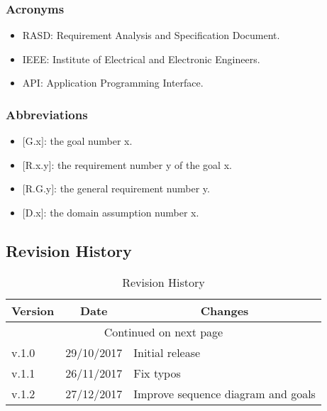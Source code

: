 \subsubsection{Acronyms}
\begin{itemize}
\renewcommand{\labelitemi}{$-$}
\item
RASD: Requirement Analysis and Specification Document.
\item
IEEE: Institute of Electrical and Electronic Engineers.
\item
API: Application Programming Interface.
\end{itemize}

\subsubsection{Abbreviations}
\begin{itemize}
\renewcommand{\labelitemi}{$-$}
\item
$[$G.x$]$: the goal number x.
\item
$[$R.x.y$]$: the requirement number y of the goal x.
\item
$[$R.G.y$]$: the general requirement number y.
\item
$[$D.x$]$: the domain assumption number x.
\end{itemize}

\subsection{Revision History}
\begin{center}
\begin{longtable}{|p{2cm} | p{3cm}| p{8cm}|}
\hline \multicolumn{1}{|c|}{\textbf{Version}} & \multicolumn{1}{c|}{\textbf{Date}} & \multicolumn{1}{c|}{\textbf{Changes}} \\ \hline 
\endfirsthead
\hline
\endhead
\hline \multicolumn{3}{c}{{Continued on next page}} \\
\endfoot
\hline
\caption{Revision History}
\label{ref:revision}
\endlastfoot
v.1.0 & 29/10/2017 & Initial release \\
\hline 
v.1.1 & 26/11/2017 & Fix typos\\ 
\hline 
v.1.2 & 27/12/2017 & Improve sequence diagram and goals\\ 
\end{longtable}
\end{center}

